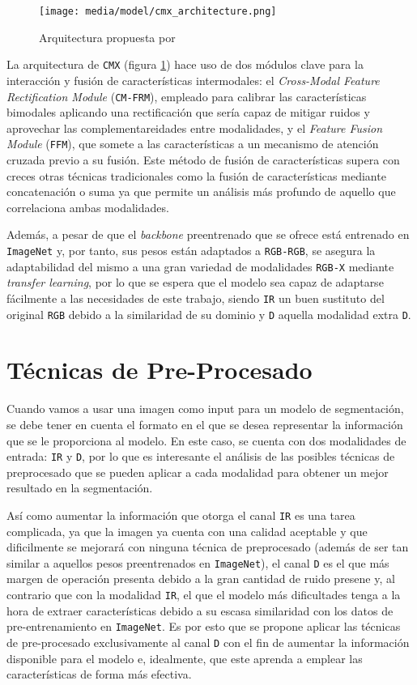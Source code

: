 \documentclass[12pt,a4paper]{report}
\begin{document}
\begin{figure}[!h]
    \centering
    \texttt{[image: media/model/cmx\_architecture.png]}
    \caption{Arquitectura propuesta por \cite{zhang2023cmxcrossmodalfusionrgbx}}
    \label{fig:cmx-architecture}
\end{figure}

La arquitectura de \texttt{CMX} (figura \ref{fig:cmx-architecture}) hace uso de dos módulos clave para la interacción y fusión de características intermodales: el \textit{Cross-Modal Feature Rectification Module} (\texttt{CM-FRM}), empleado para calibrar las características bimodales aplicando una rectificación que sería capaz de mitigar ruidos y aprovechar las complementareidades entre modalidades, y el \textit{Feature Fusion Module} (\texttt{FFM}), que somete a las características a un mecanismo de atención cruzada previo a su fusión. Este método de fusión de características supera con creces otras técnicas tradicionales como la fusión de características mediante concatenación o suma ya que permite un análisis más profundo de aquello que correlaciona ambas modalidades.

Además, a pesar de que el \textit{backbone} preentrenado que se ofrece está entrenado en \texttt{ImageNet} y, por tanto, sus pesos están adaptados a \texttt{RGB-RGB}, se asegura la adaptabilidad del mismo a una gran variedad de modalidades \texttt{RGB-X} mediante \textit{transfer learning}, por lo que se espera que el modelo sea capaz de adaptarse fácilmente a las necesidades de este trabajo, siendo \texttt{IR} un buen sustituto del original \texttt{RGB} debido a la similaridad de su dominio y \texttt{D} aquella modalidad extra \texttt{D}.

\section{Técnicas de Pre-Procesado}
\label{sec:preprocessing_techniques}
Cuando vamos a usar una imagen como input para un modelo de segmentación, se debe tener en cuenta el formato en el que se desea representar la información que se le proporciona al modelo. En este caso, se cuenta con dos modalidades de entrada: \texttt{IR} y \texttt{D}, por lo que es interesante el análisis de las posibles técnicas de preprocesado que se pueden aplicar a cada modalidad para obtener un mejor resultado en la segmentación.

Así como aumentar la información que otorga el canal \texttt{IR} es una tarea complicada, ya que la imagen ya cuenta con una calidad aceptable y que dificilmente se mejorará con ninguna técnica de preprocesado (además de ser tan similar a aquellos pesos preentrenados en \texttt{ImageNet}), el canal \texttt{D} es el que más margen de operación presenta debido a la gran cantidad de ruido presene y, al contrario que con la modalidad \texttt{IR}, el que el modelo más dificultades tenga a la hora de extraer características debido a su escasa similaridad con los datos de pre-entrenamiento en \texttt{ImageNet}. Es por esto que se propone aplicar las técnicas de pre-procesado exclusivamente al canal \texttt{D} con el fin de aumentar la información disponible para el modelo e, idealmente, que este aprenda a emplear las características de forma más efectiva.
\end{document}
